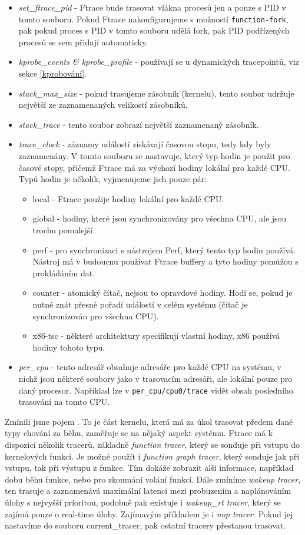 \begin{itemize}
    \item \emph{set\_ftrace\_pid} - Ftrace bude trasovat vlákna procesů jen a pouze s PID v tomto souboru. Pokud Ftrace nakonfigurujeme s možností \texttt{function-fork}, pak pokud proces s PID v tomto souboru udělá fork, pak PID podřízených procesů se sem přidají automaticky.
    \item \emph{kprobe\_events \& kprobe\_profile} - používají se u dynamických tracepointů, viz sekce \ref{kprobování}.
    \item \emph{stack\_max\_size} - pokud trasujeme zásobník (kernelu), tento soubor udržuje největší ze zaznamenaných velikostí zásobníků.
    \item \emph{stack\_trace} - tento soubor zobrazí největší zaznamenaný zásobník.
    \item \emph{trace\_clock} - záznamy událostí získávají časovou stopu, tedy kdy byly zaznamenány. V tomto souboru se nastavuje, který typ hodin je použit pro časové stopy, přičemž Ftrace má za výchozí hodiny lokální pro každé CPU. Typů hodin je několik, vyjmenujeme jich pouze pár:
    \begin{itemize}
        \item local - Ftrace použije hodiny lokální pro každé CPU.
        \item global - hodiny, které jsou synchronizovány pro všechna CPU, ale jsou trochu pomalejší
        \item perf - pro synchronizaci s nástrojem Perf, který tento typ hodin používá. Nástroj má v budoucnu používat Ftrace buffery a tyto hodiny pomůžou s prokládáním dat.
        \item counter - atomický čítač, nejsou to opravdové hodiny. Hodí se, pokud je nutné znát přesné pořadí událostí v celém systému (čítač je synchronizován pro všechna CPU).
        \item x86-tsc - některé architektury specifikují vlastní hodiny, x86 používá hodiny tohoto typu.
    \end{itemize}
    \item \emph{per\_cpu} - tento adresář obsahuje adresáře pro každé CPU na systému, v nichž jsou některé soubory jako v trasovacím adresáři, ale lokální pouze pro daný procesor. Například lze v \texttt{per\_cpu/cpu0/trace} vidět obsah posledního trasování na tomto CPU.
\end{itemize}

Zmínili jsme pojem . To je část kernelu, která má za úkol trasovat předem dané typy chování za běhu, zaměřuje se na nějaký aspekt systému. Ftrace má k dispozici několik tracerů, základně \emph{function tracer}, který se sonduje při vstupu do kernelových funkcí. Je možné použít i \emph{function graph tracer}, který sonduje jak při vstupu, tak při výstupu z funkce. Tím dokáže zobrazit alší informace, například dobu běhu funkce, nebo pro zkoumání volání funkcí. Dále zmíníme \emph{wakeup tracer}, ten trasuje a zaznamenává maximální latenci mezi probuzením a naplánováním úlohy s nejvyšší prioritou, podobně pak existuje i \emph{wakeup\_rt tracer}, který se zajímá pouze o real-time úlohy. Zajímavým příkladem je i \emph{nop tracer}. Pokud jej nastavíme do souboru current\_tracer, pak ostatní tracery přestanou trasovat.

